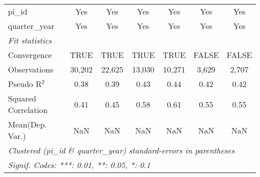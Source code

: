\begin{tabular}{lcccccc}
   pi\_id                                                     & Yes           & Yes           & Yes           & Yes           & Yes           & Yes\\  
   quarter\_year                                              & Yes           & Yes           & Yes           & Yes           & Yes           & Yes\\  
   \midrule
   \emph{Fit statistics}\\
   Convergence                                                &TRUE           & TRUE          & TRUE          & TRUE          & FALSE         & FALSE\\  
   Observations                                               & 30,202        & 22,625        & 13,030        & 10,271        & 3,629         & 2,707\\  
   Pseudo R$^2$                                               & 0.38          & 0.39          & 0.43          & 0.44          & 0.42          & 0.42\\  
   Squared Correlation                                        & 0.41          & 0.45          & 0.58          & 0.61          & 0.55          & 0.55\\  
Mean(Dep. Var.) & NaN & NaN & NaN & NaN & NaN & NaN \\
   \midrule \midrule
   \multicolumn{7}{l}{\emph{Clustered (pi\_id \& quarter\_year) standard-errors in parentheses}}\\
   \multicolumn{7}{l}{\emph{Signif. Codes: ***: 0.01, **: 0.05, *: 0.1}}\\
\end{tabular}
\par\endgroup
